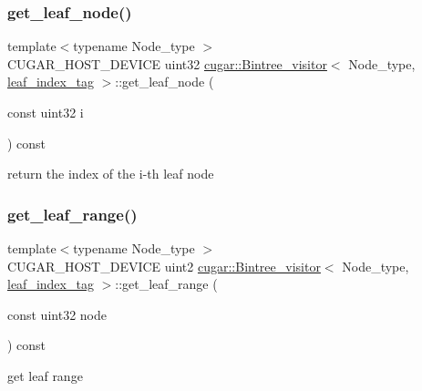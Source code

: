 \subsubsection{\texorpdfstring{get\+\_\+leaf\+\_\+node()}{get\_leaf\_node()}}
{\footnotesize\ttfamily template$<$typename Node\+\_\+type $>$ \\
C\+U\+G\+A\+R\+\_\+\+H\+O\+S\+T\+\_\+\+D\+E\+V\+I\+CE uint32 \hyperlink{structcugar_1_1_bintree__visitor}{cugar\+::\+Bintree\+\_\+visitor}$<$ Node\+\_\+type, \hyperlink{structcugar_1_1leaf__index__tag}{leaf\+\_\+index\+\_\+tag} $>$\+::get\+\_\+leaf\+\_\+node (\begin{DoxyParamCaption}\item[{const uint32}]{i }\end{DoxyParamCaption}) const\hspace{0.3cm}{\ttfamily [inline]}}

return the index of the i-\/th leaf node \mbox{\label{structcugar_1_1_bintree__visitor_3_01_node__type_00_01leaf__index__tag_01_4_a7bd4921dab757ef7d482b61d7e341512}} 
\subsubsection{\texorpdfstring{get\+\_\+leaf\+\_\+range()}{get\_leaf\_range()}}
{\footnotesize\ttfamily template$<$typename Node\+\_\+type $>$ \\
C\+U\+G\+A\+R\+\_\+\+H\+O\+S\+T\+\_\+\+D\+E\+V\+I\+CE uint2 \hyperlink{structcugar_1_1_bintree__visitor}{cugar\+::\+Bintree\+\_\+visitor}$<$ Node\+\_\+type, \hyperlink{structcugar_1_1leaf__index__tag}{leaf\+\_\+index\+\_\+tag} $>$\+::get\+\_\+leaf\+\_\+range (\begin{DoxyParamCaption}\item[{const uint32}]{node }\end{DoxyParamCaption}) const\hspace{0.3cm}{\ttfamily [inline]}}

get leaf range


